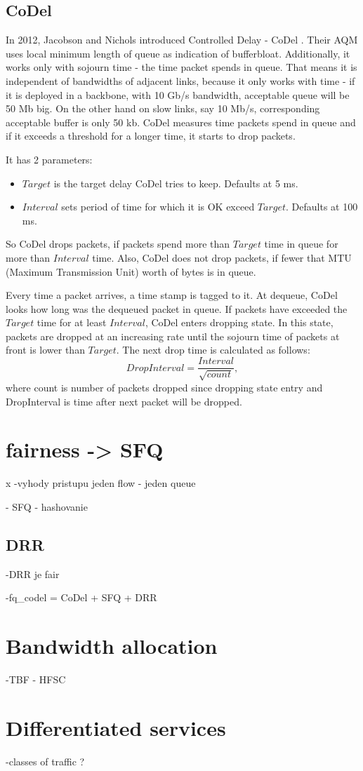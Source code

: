 \subsection{CoDel}

In 2012, Jacobson and Nichols introduced Controlled Delay - CoDel \cite{CoDel}. Their AQM uses local minimum length of queue as indication of bufferbloat. Additionally, it works only with sojourn time - the time packet spends in queue. That means it is independent of bandwidths of adjacent links, because it only works with time - if it is deployed in a backbone, with 10 Gb/s bandwidth, acceptable queue will be 50 Mb big. On the other hand on slow links, say 10 Mb/s, corresponding acceptable buffer is only 50 kb. CoDel measures time packets spend in queue and if it exceeds a threshold for a longer time, it starts to drop packets.

It has 2 parameters:
\begin{itemize}
	\item $Target$ is the target delay CoDel tries to keep. Defaults at 5 ms.
	\item $Interval$ sets period of time for which it is OK exceed $Target$. Defaults at 100 ms.
\end{itemize}
So CoDel drops packets, if packets spend more than $Target$ time in queue for more than $Interval$ time. Also, CoDel does not drop packets, if fewer that MTU (Maximum Transmission Unit) worth of bytes is in queue.

Every time a packet arrives, a time stamp is tagged to it. At dequeue, CoDel looks how long was the dequeued packet in queue. If packets have exceeded the $Target$ time for at least $Interval$, CoDel enters dropping state. In this state, packets are dropped at an increasing rate until the sojourn time of packets at front is lower than $Target$. The next drop time is calculated as follows:
\[
  DropInterval = \frac{Interval}{\sqrt{count}},
\]
where count is number of packets dropped since dropping state entry and DropInterval is time after next packet will be dropped.







\section{fairness -> SFQ}x
-vyhody pristupu jeden flow - jeden queue

- SFQ - hashovanie


\subsection{DRR}
-DRR je fair

-fq\_codel = CoDel + SFQ + DRR

\section{Bandwidth allocation}

-TBF - HFSC

\section{Differentiated services}
-classes of traffic
?

